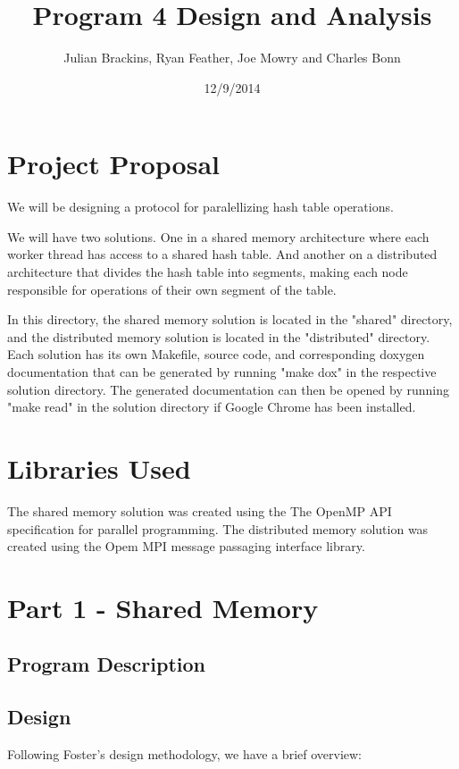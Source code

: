 \documentclass{article}
\begin{document}
\title{Program 4 Design and Analysis}
\author{Julian Brackins, Ryan Feather, Joe Mowry and Charles Bonn}
\date{12/9/2014}
\maketitle

\section{Project Proposal}

We will be designing a protocol for paralellizing hash table operations.

We will have two solutions. One in a shared memory architecture where each worker thread has access to a shared hash table. And another on a distributed architecture that divides the hash table into segments, making each node responsible for operations of their own segment of the table.

In this directory, the shared memory solution is located in the "shared" directory, and the distributed memory solution is located in the "distributed" directory. Each solution has its own Makefile, source code, 
and corresponding doxygen documentation that can be generated by running "make dox" in the respective solution directory. The generated documentation can then be opened by running "make read" in the solution 
directory if Google Chrome has been installed.

\section{Libraries Used}

The shared memory solution was created using the The OpenMP API specification for parallel programming. The distributed memory solution 
was created using the Opem MPI message passaging interface library.

\section{Part 1 - Shared Memory}

\subsection{Program Description}

\subsection{Design}
Following Foster's design methodology, we have a brief overview:
\end{document}
